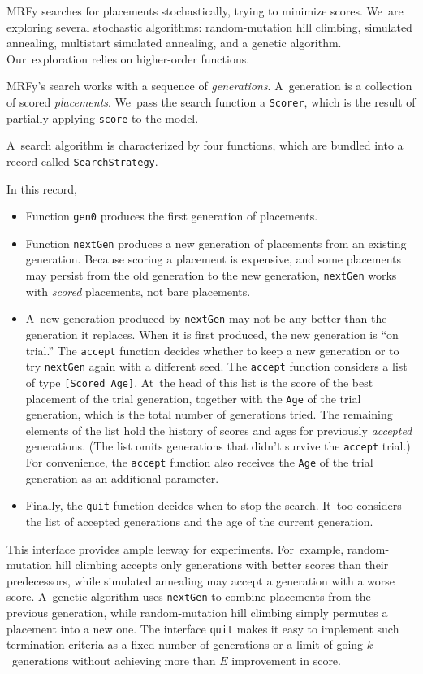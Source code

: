 \documentclass[preprint,nonatbib,blockstyle,nocopyrightspace,times]{sigplanconf}
\newcommand\smallverbatiminput[1]{{\par\unskip\small}}
\newcommand\smallfuzzverbatiminput[2]{{\par\unskip\small\hfuzz=#1 }}
\begin{document}
MRFy searches for placements stochastically,
trying to minimize scores.
We~are exploring several stochastic algorithms: random-mutation hill
climbing, simulated  
annealing, multistart simulated annealing, and a genetic algorithm.
Our~exploration relies on higher-order functions.

MRFy's search works with a sequence of \emph{generations}.
A~generation is a collection of scored \emph{placements}.
We~pass the
search function a \texttt{Scorer}, which is the result of partially
applying \texttt{score} to the model.
\smallverbatiminput{scoredecl}
A~search algorithm is characterized by four functions, which are
bundled into a record called \texttt{SearchStrategy}.
\smallfuzzverbatiminput{2.3pt}{strategy}
In this record,
\begin{itemize}
\item
Function \texttt{gen0} produces the first generation of placements.
\item
Function \texttt{nextGen} produces a new generation of placements from
an existing generation.
Because scoring a placement is expensive, 
and some placements may persist from the old generation to the new
generation, \texttt{nextGen} works with \emph{scored} placements, not
bare placements.
\item
A~new generation produced by \texttt{nextGen} may not be any better
than the generation it replaces.
When it is first produced, the new generation is ``on trial.''
The \texttt{accept} function decides whether to keep a new generation
or to try \texttt{nextGen} again with a different seed.
The \texttt{accept} function considers a list of type
\texttt{[Scored~Age]}.
At~the head of this list is the score of the best
placement of the trial generation, together with the \texttt{Age} of the trial
generation, which is the total number of generations tried.
The remaining elements of the list hold the history of scores and ages for
previously \emph{accepted} generations.
(The list omits generations that didn't survive the \texttt{accept} trial.)
For convenience, the \texttt{accept} function also receives
the \texttt{Age} of the trial generation as an additional parameter.
\item
Finally, the \texttt{quit} function decides when to stop the search.
It~too considers the list of accepted generations and the age of the current
generation. 
\end{itemize}
This interface provides ample leeway for experiments.
For~example, random-mutation hill climbing accepts only generations
with better scores than their predecessors,
while simulated annealing may accept a generation with a worse score.
A~genetic algorithm uses \texttt{nextGen} to
combine placements from the previous generation, while
random-mutation
hill climbing simply permutes a placement into a new one.
The interface \texttt{quit} makes it easy
to implement such termination criteria as a fixed number of generations
or a limit of going $k$~generations without achieving more than $E$
improvement in score. 
\end{document}
